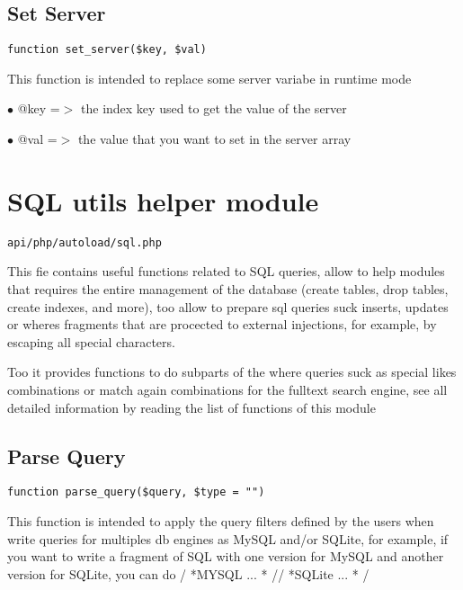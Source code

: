 \documentclass[a4paper]{book}
\begin{document}
\hypertarget{toc239}{}
\subsection{Set Server}

\begin{lstlisting}
function set_server($key, $val)
\end{lstlisting}

This function is intended to replace some server variabe in runtime mode

\begin{compactitem}
\item[\color{myblue}$\bullet$] @key =$>$ the index key used to get the value of the server
\item[\color{myblue}$\bullet$] @val =$>$ the value that you want to set in the server array
\end{compactitem}

\hypertarget{toc240}{}
\section{SQL utils helper module}

\begin{lstlisting}
api/php/autoload/sql.php
\end{lstlisting}

This fie contains useful functions related to SQL queries, allow to help modules that requires
the entire management of the database (create tables, drop tables, create indexes, and more),
too allow to prepare sql queries suck inserts, updates or wheres fragments that are procected
to external injections, for example, by escaping all special characters.

Too it provides functions to do subparts of the where queries suck as special likes combinations
or match again combinations for the fulltext search engine, see all detailed information by
reading the list of functions of this module

\hypertarget{toc241}{}
\subsection{Parse Query}

\begin{lstlisting}
function parse_query($query, $type = "")
\end{lstlisting}

This function is intended to apply the query filters defined by the users
when write queries for multiples db engines as MySQL and/or SQLite, for
example, if you want to write a fragment of SQL with one version for MySQL
and another version for SQLite, you can do / *MYSQL ... * // *SQLite ... * /
\end{document}
